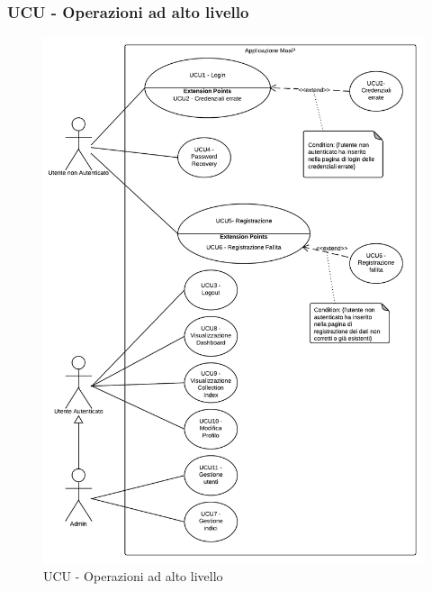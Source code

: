 \subsubsection{UCU - Operazioni ad alto livello} 
    \begin{center}
    \begin{figure}[H]
      \includegraphics[scale=0.16]{UML/UCU - Operazioni ad alto livello.png}
      \caption{UCU - Operazioni ad alto livello} 
    \end{figure}
    \end{center}
    
